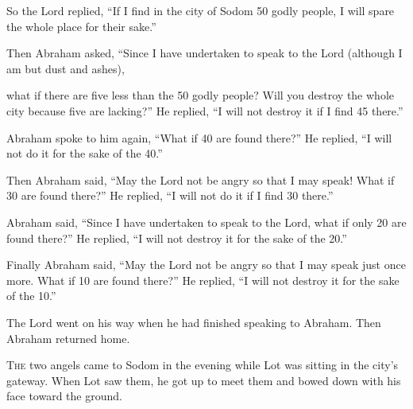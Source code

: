 \begin{scripture}
 So the Lord replied, ``If I find in the city of Sodom 50 godly people, I will spare the whole place for their sake.''
\everypar{}

 Then Abraham asked, ``Since I have undertaken to speak to the Lord (although I am but dust and ashes),
 what if there are five less than the 50 godly people? Will you destroy the whole city because five are lacking?'' He replied, ``I will not destroy it if I find 45 there.''
\everypar{}

 Abraham spoke to him again, ``What if 40 are found there?'' He replied, ``I will not do it for the sake of the 40.''
\everypar{}

 Then Abraham said, ``May the Lord not be angry so that I may speak! What if 30 are found there?'' He replied, ``I will not do it if I find 30 there.''
\everypar{}

 Abraham said, ``Since I have undertaken to speak to the Lord, what if only 20 are found there?'' He replied, ``I will not destroy it for the sake of the 20.''
\everypar{}

 Finally Abraham said, ``May the Lord not be angry so that I may speak just once more. What if 10 are found there?'' He replied, ``I will not destroy it for the sake of the 10.''
\everypar{}

 The Lord went on his way when he had finished speaking to Abraham. Then Abraham returned home.

 \allowchapbreak\hypertarget{ch-genesis-19}{}\lettrine[lines=5]{\color{pentateuch}T}{\textsc{he}} two angels came to Sodom in the evening while Lot was sitting in the city's gateway. When Lot saw them, he got up to meet them and bowed down with his face toward the ground.\everypar{}
\everypar{}


\end{scripture}
